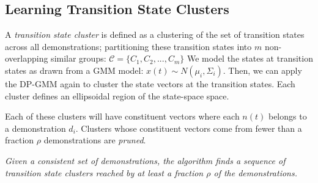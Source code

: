 \documentclass[0-main.tex]{subfiles}
\begin{document}
\subsection{Learning Transition State Clusters}
A \emph{transition state cluster} is
defined as a clustering of the set of transition states across all demonstrations; partitioning these transition states into $m$ non-overlapping similar groups:
$
\mathcal{C} = \{C_1, C_2,...,C_m\}
$
We model the states at transition states as drawn from a GMM model: ${x}(t) \sim N(\mu_i, \Sigma_i)$.
Then, we can apply the DP-GMM again to cluster the state vectors at the transition states.
Each cluster defines an ellipsoidal region of the state-space space.

\noindent Each of these clusters will have constituent vectors where each $n(t)$ belongs to a demonstration $d_i$. 
Clusters whose constituent vectors come from fewer than a fraction $\rho$ demonstrations are \emph{pruned}.

\vspace{0.5em}

\noindent \textit{Given a consistent set of demonstrations, the algorithm finds a sequence of transition state clusters reached by at least a fraction $\rho$ of the demonstrations.}
\end{document}
